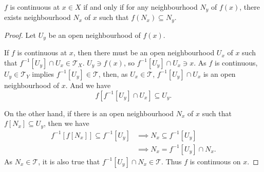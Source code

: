 \begin{proposition}
	$f$ is continuous at $x \in X$ if and only if for any neighbourhood $N_{y}$ of $f(x)$, there exists neighbourhood $N_x$ of $x$ such that $f(N_x) \subseteq N_y$.
	
	\begin{proof}
		Let $U_y$ be an open neighbourhood of $f(x)$.
		
		If $f$ is continuous at $x$, then there must be an open neighbourhood $U_x$ of $x$ such that $f^{-1}[U_y] \cap U_x \in \mathcal T_X$. $U_y \ni f(x)$, so $f^{-1}[U_y] \cap U_x \ni x$. As $f$ is continuous, $U_y \in \mathcal T_Y$ implies $f^{-1}[U_y] \in \mathcal T$, then, as $U_x \in \mathcal T$, $f^{-1}[U_y] \cap U_x$ is an open neighbourhood of $x$. And we have
		$$
		f[f^{-1}[U_y] \cap U_x] \subseteq U_y.
		$$
		
		On the other hand, if there is an open neighbourhood $N_x$ of $x$ such that $f[N_x] \subseteq U_y$, then we have
		$$
		\begin{aligned}
			f^{-1}[f[N_x]] \subseteq f^{-1}[U_y] &\implies N_x \subseteq f^{-1}[U_y] \\
			&\implies N_x = f^{-1}[U_y] \cap N_x.
		\end{aligned}
		$$
		As $N_x \in \mathcal T$, it is also true that $f^{-1}[U_y] \cap N_x \in \mathcal T$. Thus $f$ is continuous on $x$.
	\end{proof}
\end{proposition}










































%